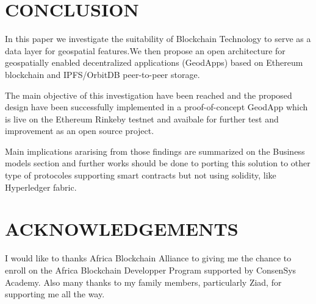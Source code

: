 \documentclass{isprs} %
\begin{document}
\section{CONCLUSION}\label{sec:CONCLUSION}

In this paper we investigate the suitability of Blockchain Technology to serve as a data layer for geospatial features.We then propose an open architecture for geospatially enabled decentralized applications (GeodApps) based on Ethereum blockchain and IPFS/OrbitDB peer-to-peer storage.

The main objective of this investigation have been reached and the proposed design have been successfully implemented in a proof-of-concept GeodApp which is live on the Ethereum Rinkeby testnet and avaibale for further test and improvement as an open source project.
 
Main implications ararising from those findings are summarized on the Business models section and further works should be done to porting this solution to other type of protocoles supporting smart contracts but not using solidity, like Hyperledger fabric.


\section*{ACKNOWLEDGEMENTS}\label{ACKNOWLEDGEMENTS}

I would like to thanks Africa Blockchain Alliance to giving me the chance to enroll on the Africa Blockchain Developper Program supported by ConsenSys Academy. Also many thanks to my family members, particularly Ziad, for supporting me all the way.

{
	\begin{spacing}{1.17}
		\normalsize
	\end{spacing}
}
\end{document}

